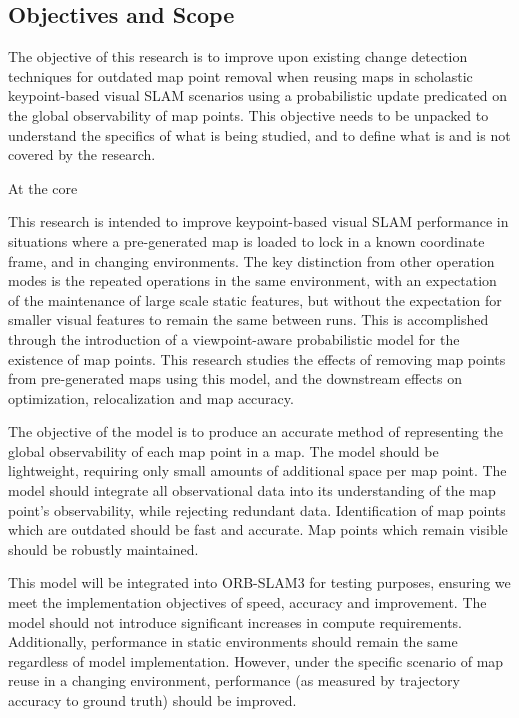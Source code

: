\subsection{Objectives and Scope}
\label{objectives}

The objective of this research is to improve upon existing change detection techniques for outdated map point removal when reusing maps in scholastic keypoint-based visual SLAM scenarios using a probabilistic update predicated on the global observability of map points. This objective needs to be unpacked to understand the specifics of what is being studied, and to define what is and is not covered by the research.

At the core


This research is intended to improve keypoint-based visual SLAM performance in situations where a pre-generated map is loaded to lock in a known coordinate frame, and in changing environments. The key distinction from other operation modes is the repeated operations in the same environment, with an expectation of the maintenance of large scale static features, but without the expectation for smaller visual features to remain the same between runs. This is accomplished through the introduction of a viewpoint-aware probabilistic model for the existence of map points. This research studies the effects of removing map points from pre-generated maps using this model, and the downstream effects on optimization, relocalization and map accuracy.


The objective of the model is to produce an accurate method of representing the global observability of each map point in a map. The model should be lightweight, requiring only small amounts of additional space per map point. The model should integrate all observational data into its understanding of the map point's observability, while rejecting redundant data. Identification of map points which are outdated should be fast and accurate. Map points which remain visible should be robustly maintained.


This model will be integrated into ORB-SLAM3 for testing purposes, ensuring we meet the implementation objectives of speed, accuracy and improvement. The model should not introduce significant increases in compute requirements. Additionally, performance in static environments should remain the same regardless of model implementation. However, under the specific scenario of map reuse in a changing environment, performance (as measured by trajectory accuracy to ground truth) should be improved.
